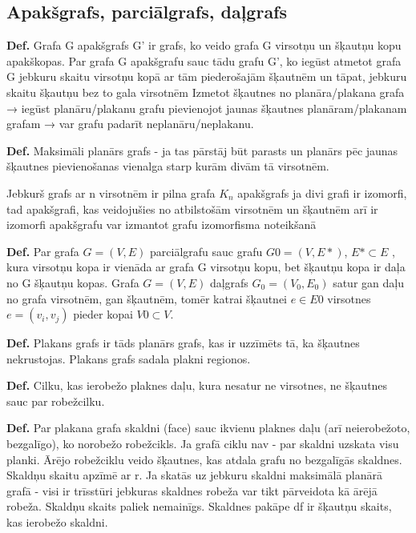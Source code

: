 \documentclass{article}
\begin{document}
\subsection{Apakšgrafs, parciālgrafs, daļgrafs}
\textbf{Def.}  Grafa G apakšgrafs G' ir grafs, ko veido grafa G virsotņu un šķautņu kopu apakškopas.  Par grafa G apakšgrafu sauc tādu grafu G', ko iegūst atmetot grafa G jebkuru skaitu virsotņu kopā ar tām piederošajām šķautnēm un tāpat, jebkuru skaitu šķautņu bez to gala virsotnēm
Izmetot šķautnes no planāra/plakana grafa → iegūst planāru/plakanu grafu pievienojot jaunas šķautnes planāram/plakanam grafam → var grafu padarīt neplanāru/neplakanu.

\textbf{Def.}  Maksimāli planārs grafs - ja tas pārstāj būt parasts un planārs pēc jaunas šķautnes pievienošanas vienalga starp kurām divām tā virsotnēm.

Jebkurš grafs ar n virsotnēm ir pilna grafa $K_n$ apakšgrafs ja divi grafi ir izomorfi, tad apakšgrafi, kas veidojušies no atbilstošām virsotnēm un šķautnēm arī ir izomorfi apakšgrafu var izmantot grafu izomorfisma noteikšanā

\textbf{Def.} Par grafa $G = (V,E)$ parciālgrafu sauc grafu $G 0 = (V , E *)$, $E* \subset E$ , kura virsotņu kopa ir vienāda ar grafa G virsotņu kopu, bet šķautņu kopa ir daļa no G šķautņu kopas.  Grafa $G = (V,E)$ daļgrafs $G_0 = (V_0 , E_0 )$ satur gan daļu no grafa virsotnēm, gan šķautnēm, tomēr katrai šķautnei $e \in E 0$ virsotnes $e = (v_i , v_j )$ pieder kopai $V 0 ⊂ V$.

\textbf{Def.} Plakans grafs ir tāds planārs grafs, kas ir uzzīmēts tā, ka šķautnes nekrustojas.  Plakans grafs sadala plakni regionos.

\textbf{Def.}  Cilku, kas ierobežo plaknes daļu, kura nesatur ne virsotnes, ne šķautnes sauc par robežcilku.

\textbf{Def.} Par plakana grafa skaldni (face) sauc ikvienu plaknes daļu (arī neierobežoto, bezgalīgo), ko norobežo robežcikls.  Ja grafā ciklu nav - par skaldni uzskata visu planki.  Ārējo robežciklu veido šķautnes, kas atdala grafu no bezgalīgās skaldnes.  Skaldņu skaitu apzīmē ar r. Ja skatās uz jebkuru skaldni maksimālā planārā grafā - visi ir trīsstūri jebkuras skaldnes robeža var tikt pārveidota kā ārējā robeža. Skaldņu skaits paliek nemainīgs.  Skaldnes pakāpe df ir šķautņu skaits, kas ierobežo skaldni.
\end{document}
